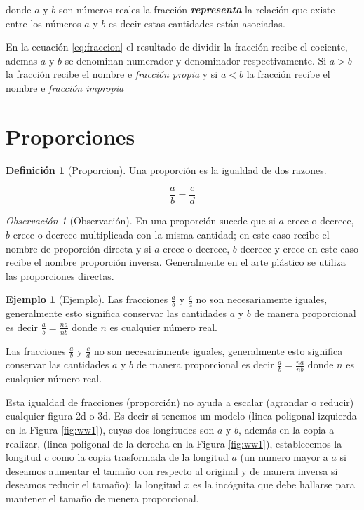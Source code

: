 \documentclass[
  11pt,
]{krantz}
\theoremstyle{definition}
\newtheorem{definition}{Definición}[chapter]
\theoremstyle{definition}
\newtheorem{example}{Ejemplo}[chapter]
\theoremstyle{definition}
\theoremstyle{definition}
\theoremstyle{remark}
\newtheorem*{remark}{Observación}
\begin{document}
donde \(a\) y \(b\) son números reales la fracción \textbf{\emph{representa}} la relación que existe entre los números \(a\) y \(b\) es decir estas cantidades están asociadas.

En la ecuación \eqref{eq:fraccion} el resultado de dividir la fracción recibe el cociente, ademas \(a\) y \(b\) se denominan numerador y denominador respectivamente. Si \(a>b\) la fracción recibe el nombre e \emph{fracción propia}  y si \(a<b\) la fracción recibe el nombre e \emph{fracción impropia} 

\hypertarget{proporciones}{%
\section{Proporciones}\label{proporciones}}

\begin{definition}[Proporcion]
\protect\hypertarget{def:proporcion}{}\label{def:proporcion}Una proporción es la igualdad de dos razones.

\[
\frac{a}{b}=\frac{c}{d}\label{eq:proporcion}
\]
\end{definition}

\begin{remark}[Observación]
En una proporción sucede que si \(a\) crece o decrece, \(b\) crece o decrece multiplicada con la misma cantidad; en este caso recibe el nombre de proporción directa y si \(a\) crece o decrece, \(b\) decrece y crece en este caso recibe el nombre proporción inversa. Generalmente en el arte plástico se utiliza las proporciones directas.
\end{remark}

\begin{example}[Ejemplo]
\protect\hypertarget{exm:wwwww}{}\label{exm:wwwww}Las fracciones \(\frac{a}{b}\) y \(\frac{c}{d}\) no son necesariamente iguales, generalmente esto significa conservar las cantidades \(a\) y \(b\) de manera proporcional es decir \(\frac{a}{b}=\frac{na}{nb}\) donde \(n\) es cualquier número real.
\end{example}

Las fracciones \(\frac{a}{b}\) y \(\frac{c}{d}\) no son necesariamente iguales, generalmente esto significa conservar las cantidades \(a\) y \(b\) de manera proporcional es decir \(\frac{a}{b}=\frac{na}{nb}\) donde \(n\) es cualquier número real.

Esta igualdad de fracciones (proporción) no ayuda a escalar (agrandar o reducir) cualquier figura 2d o 3d. Es decir si tenemos un modelo (linea poligonal izquierda en la Figura \ref{fig:ww1}), cuyas dos longitudes son \(a\) y \(b\), además en la copia a realizar, (linea poligonal de la derecha en la Figura \ref{fig:ww1}), establecemos la longitud \(c\) como la copia trasformada de la longitud \(a\) (un numero mayor a \(a\) si deseamos aumentar el tamaño con respecto al original y de manera inversa si deseamos reducir el tamaño); la longitud \(x\) es la incógnita que debe hallarse para mantener el tamaño de menera proporcional.
\end{document}
